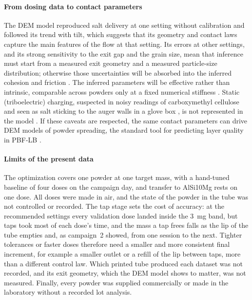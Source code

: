 \documentclass[preprint,12pt]{elsarticle}
\begin{document}
\paragraph{From dosing data to contact parameters} The DEM model reproduced salt delivery at one setting without calibration and followed its trend with tilt, which suggests that its geometry and contact laws capture the main features of the flow at that setting. Its errors at other settings, and its strong sensitivity to the exit gap and the grain size, mean that inference must start from a measured exit geometry and a measured particle-size distribution; otherwise those uncertainties will be absorbed into the inferred cohesion and friction \cite{Coetzee2017Review,ElKassem2021Sensitivity}. The inferred parameters will be effective rather than intrinsic, comparable across powders only at a fixed numerical stiffness \cite{Thakur2014Micromechanical}. Static (triboelectric) charging, suspected in noisy readings of carboxymethyl cellulose and seen as salt sticking to the auger walls in a glove box \cite{Charles2026Open}, is not represented in the model \cite{Galindo2024Charging}. If these caveats are respected, the same contact parameters can drive DEM models of powder spreading, the standard tool for predicting layer quality in PBF-LB \cite{Haeri2017Optimisation,Nan2018Jamming,Meier2019Critical,Shaheen2021Influence}.

\paragraph{Limits of the present data} The optimization covers one powder at one target mass, with a hand-tuned baseline of four doses on the campaign day, and transfer to AlSi10Mg rests on one dose. All doses were made in air, and the state of the powder in the tube was not controlled or recorded. The tap stage sets the cost of accuracy: at the recommended settings every validation dose landed inside the 3~mg band, but taps took most of each dose's time, and the mass a tap frees falls as the lip of the tube empties and, as campaign~2 showed, from one session to the next. Tighter tolerances or faster doses therefore need a smaller and more consistent final increment, for example a smaller outlet or a refill of the lip between taps, more than a different control law. Which printed tube produced each dataset was not recorded, and its exit geometry, which the DEM model shows to matter, was not measured. Finally, every powder was supplied commercially or made in the laboratory without a recorded lot analysis.
\end{document}
